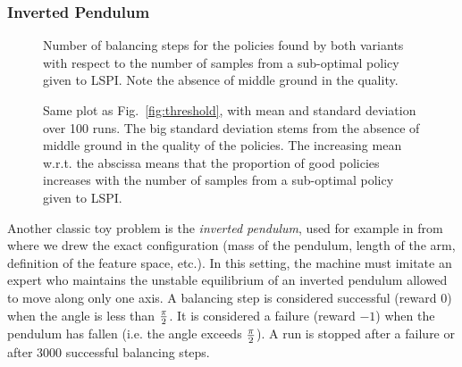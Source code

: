 \documentclass{llncs}
\begin{document}
\subsubsection{Inverted Pendulum}
\begin{figure}
\begin{minipage}[t]{.4\linewidth}
    \begin{center}
      \resizebox{\columnwidth}{!}{}
      \caption{Number of balancing steps for the policies found by both variants with respect to the number of samples from a sub-optimal policy given to LSPI. Note the absence of middle ground in the quality.}
      \label{fig:threshold}
    \end{center}
\end{minipage}
\hfill
\begin{minipage}[t]{.4\linewidth}
    \begin{center}
      \resizebox{\columnwidth}{!}{}
      \caption{Same plot as Fig.~\ref{fig:threshold}, with mean and standard deviation over 100 runs. The big standard deviation stems from the absence of middle ground in the quality of the policies. The increasing mean w.r.t. the abscissa means that the proportion of good policies increases with the number of samples from a sub-optimal policy given to LSPI.}
      \label{fig:threshold_EB}
    \end{center}
\end{minipage}
\end{figure}


Another classic toy problem is the \emph{inverted pendulum}, used for example in \citep{lagoudakis2003least} from where we drew the exact configuration (mass of the pendulum, length of the arm, definition of the feature space, etc.). In this setting, the machine must imitate an expert who maintains the unstable equilibrium of an inverted pendulum allowed to move along only one axis. A balancing step is considered successful (reward $0$) when the angle is less than $\pi\over 2$. It is considered a failure (reward $-1$) when the pendulum has fallen (i.e. the angle exceeds $\pi \over 2$). A run is stopped after a failure or after 3000 successful balancing steps.\\
\end{document}
